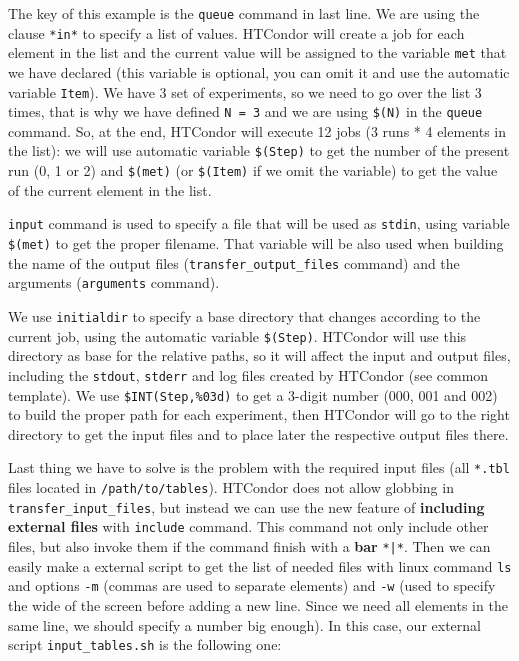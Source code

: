 \documentclass[a4paper,10pt]{article}
\begin{document}
The key of this example is the \texttt{queue} command in last line. We are using the
clause \texttt{*in*} to specify a list of values. HTCondor will create a job for each
element in the list and the current value will be assigned to the variable \texttt{met}
that we have declared (this variable is optional, you can omit it and use the
automatic variable \texttt{Item}). We have 3 set of experiments, so we need to go over
the list 3 times, that is why we have defined \texttt{N = 3} and we are using \texttt{\$(N)} in
the \texttt{queue} command. So, at the end, HTCondor will execute 12 jobs (3 runs * 4
elements in the list): we will use automatic variable \texttt{\$(Step)} to get the
number of the present run (0, 1 or 2) and \texttt{\$(met)} (or \texttt{\$(Item)} if we omit the
variable) to get the value of the current element in the list.

\texttt{input} command is used to specify a file that will be used as \texttt{stdin}, using
variable \texttt{\$(met)} to get the proper filename. That variable will be also used
when building the name of the output files (\texttt{transfer\_output\_files} command) and
the arguments (\texttt{arguments} command).

We use \texttt{initialdir} to specify a base directory that changes according to the
current job, using the automatic variable \texttt{\$(Step)}. HTCondor will use this
directory as base for the relative paths, so it will affect the input and output
files, including the \texttt{stdout}, \texttt{stderr} and log files created by HTCondor (see
common template). We use \texttt{\$INT(Step,\%03d)} to get a 3-digit number (000, 001
and 002) to build the proper path for each experiment, then HTCondor will go to
the right directory to get the input files and to place later the respective
output files there.

Last thing we have to solve is the problem with the required input files (all
\texttt{*.tbl} files located in \texttt{/path/to/tables}). HTCondor does not allow globbing in
\texttt{transfer\_input\_files}, but instead we can use the new feature of \textbf{including
external files} with \texttt{include} command. This command not only include other
files, but also invoke them if the command finish with a \textbf{bar} \texttt{*|*}. Then we
can easily make a external script to get the list of needed files with linux
command \texttt{ls} and options \texttt{-m} (commas are used to separate elements) and \texttt{-w}
(used to specify the wide of the screen before adding a new line. Since we need
all elements in the same line, we should specify a number big enough). In this
case, our external script \texttt{input\_tables.sh} is the following one:
\end{document}

